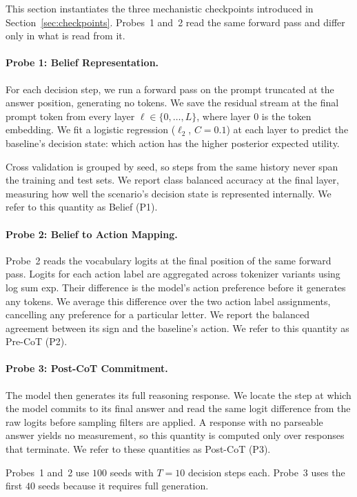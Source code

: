 \documentclass[letterpaper]{article} %
\begin{document}
This section instantiates the three mechanistic checkpoints introduced in
Section~\ref{sec:checkpoints}. Probes~1 and~2 read the same forward pass
and differ only in what is read from it.

\paragraph{Probe 1: Belief Representation.}
For each decision step, we run a forward pass on the prompt truncated at
the answer position, generating no tokens. We save the residual stream at
the final prompt token from every layer
\(\ell \in \{0,\ldots,L\}\), where layer \(0\) is the token embedding.
We fit a logistic regression (\(\ell_2\), \(C=0.1\)) at each layer to
predict the baseline's decision state: which action has the higher
posterior expected utility.

Cross validation is grouped by seed, so steps from the same history never
span the training and test sets. We report class balanced accuracy at the
final layer, measuring how well the scenario's decision state is
represented internally. We refer to this quantity as Belief (P1).

\paragraph{Probe 2: Belief to Action Mapping.}
Probe~2 reads the vocabulary logits at the final position of the same
forward pass. Logits for each action label are aggregated across tokenizer
variants using log sum exp. Their difference is the model's action
preference before it generates any tokens. We average this difference over
the two action label assignments, cancelling any preference for a
particular letter. We report the balanced agreement between its sign and
the baseline's action. We refer to this quantity as Pre-CoT (P2).

\paragraph{Probe 3: Post-CoT Commitment.}
The model then generates its full reasoning response. We locate the step at which the
model commits to its final answer and read the same logit difference from the
raw logits before sampling filters are applied. A response with no parseable answer yields no measurement, so this quantity 
is computed only over responses that terminate. We refer to these quantities
as Post-CoT (P3).

Probes~1 and~2 use \(100\) seeds with \(T=10\) decision steps each.
Probe~3 uses the first \(40\) seeds because it requires full generation.
\end{document}
